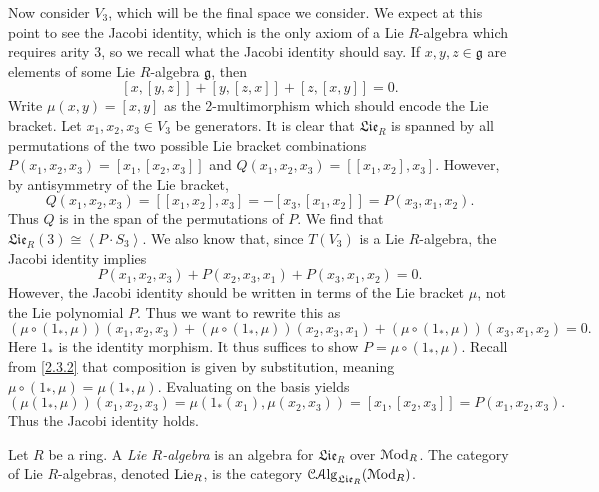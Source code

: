 \begin{discussion}
	Now consider $V_3$, which will be the final space we consider. We expect at this point to see the Jacobi identity, which is the only axiom of a Lie $R$-algebra which requires arity 3, so we recall what the Jacobi identity should say. If $x,y,z\in \mathfrak{g} $ are elements of some Lie $R$-algebra $\mathfrak{g} $, then
	\[
		[x,[y,z]] + [y,[z,x]] + [z,[x,y]]=0
	.\]
	Write $\mu (x,y) = [x,y]$ as the 2-multimorphism which should encode the Lie bracket. Let $x_1,x_2,x_3\in V_3$ be generators. It is clear that $\mathfrak{Lie} _R$ is spanned by all permutations of the two possible Lie bracket combinations $P(x_1,x_2,x_3)=[x_1,[x_2,x_3]]$ and $Q(x_1,x_2,x_3)=[[x_1,x_2],x_3]$. However, by antisymmetry of the Lie bracket,
	\[
		Q(x_1,x_2,x_3) = [[x_1,x_2],x_3] = -[x_3,[x_1,x_2]] = P(x_3,x_1,x_2)
	.\]
	Thus $Q$ is in the span of the permutations of $P$. We find that $\mathfrak{Lie}_R(3) \cong \left\langle P\cdot S_3 \right\rangle $. We also know that, since $T(V_3)$ is a Lie $R$-algebra, the Jacobi identity implies
	\[
		P(x_1,x_2,x_3) + P(x_2,x_3,x_1) + P(x_3,x_1,x_2) = 0
	.\]
	However, the Jacobi identity should be written in terms of the Lie bracket $\mu $, not the Lie polynomial $P$. Thus we want to rewrite this as
	\[
		(\mu \circ (1_*,\mu ))(x_1,x_2,x_3) + (\mu \circ (1_*,\mu ))(x_2,x_3,x_1) + (\mu \circ (1_*,\mu ))(x_3,x_1,x_2)=0
	.\]
	Here $1_*$ is the identity morphism. It thus suffices to show $P=\mu \circ (1_*,\mu )$. Recall from \cref{2.3.2} that composition is given by substitution, meaning $\mu \circ (1_*,\mu ) = \mu (1_*,\mu )$. Evaluating on the basis yields
	\[
		(\mu (1_*,\mu ))(x_1,x_2,x_3) = \mu (1_*(x_1),\mu (x_2,x_3)) = [x_1,[x_2,x_3]] = P(x_1,x_2,x_3)
	.\]
	Thus the Jacobi identity holds.
\end{discussion}

\begin{definition}\label{2.3.4}
	Let $R$ be a ring. A \emph{Lie $R$-algebra} is an algebra for $\mathfrak{Lie}_R$ over $\mathcal{M}\mathrm{od} _R$. The category of Lie $R$-algebras, denoted $\operatorname{Lie} _R$, is the category $\mathcal{C}\mathcal{A}\mathrm{lg}_{\mathfrak{Lie}_R} (\mathcal{M}\mathrm{od} _R)$.
\end{definition}

